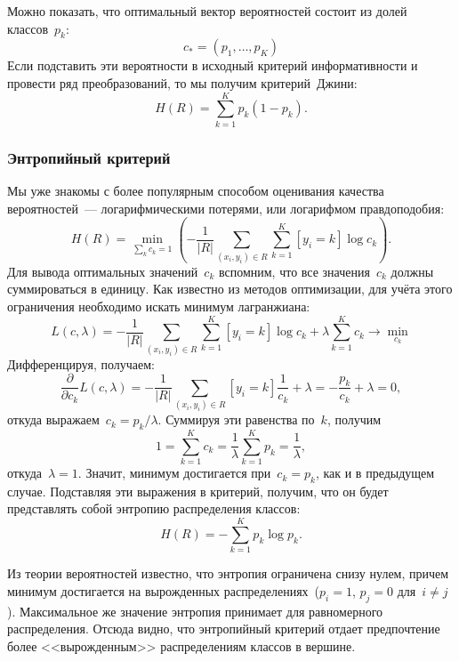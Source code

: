 \documentclass[12pt,fleqn]{article}
\begin{document}
Можно показать, что оптимальный вектор вероятностей состоит из долей классов~$p_k$:
\[
    c_* = (p_1, \dots, p_K)
\]
Если подставить эти вероятности в исходный критерий информативности
и провести ряд преобразований, то мы получим критерий~Джини:
\[
    H(R)
    =
    \sum_{k = 1}^{K}
        p_k (1 - p_k).
\]

\subsubsection{Энтропийный критерий}
Мы уже знакомы с более популярным способом оценивания качества
вероятностей~--- логарифмическими потерями, или логарифмом правдоподобия:
\[
    H(R)
    =
    \min_{\sum_k c_k = 1} \left(
        -
        \frac{1}{|R|}
        \sum_{(x_i, y_i) \in R}
        \sum_{k = 1}^{K}
            [y_i = k]
            \log c_k
    \right).
\]
Для вывода оптимальных значений~$c_k$ вспомним, что все значения~$c_k$
должны суммироваться в единицу.
Как известно из методов оптимизации, для учёта этого ограничения необходимо искать
минимум лагранжиана:
\[
    L(c, \lambda)
    =
    -
    \frac{1}{|R|}
    \sum_{(x_i, y_i) \in R}
    \sum_{k = 1}^{K}
        [y_i = k]
        \log c_k
    +
    \lambda
    \sum_{k = 1}^{K}
        c_k
    \to
    \min_{c_k}
\]
Дифференцируя, получаем:
\[
    \frac{\partial}{\partial c_k}
    L(c, \lambda)
    =
    -
    \frac{1}{|R|}
    \sum_{(x_i, y_i) \in R}
        [y_i = k]
        \frac{1}{c_k}
    +
    \lambda
    =
    - \frac{p_k}{c_k}
    +
    \lambda
    =
    0,
\]
откуда выражаем~$c_k = p_k / \lambda$.
Суммируя эти равенства по~$k$, получим
\[
    1 = \sum_{k = 1}^{K} c_k = \frac{1}{\lambda} \sum_{k = 1}^{K} p_k = \frac{1}{\lambda},
\]
откуда~$\lambda = 1$.
Значит, минимум достигается при~$c_k = p_k$, как и в предыдущем случае.
Подставляя эти выражения в критерий, получим, что он будет представлять собой энтропию распределения классов:
\[
    H(R)
    =
    -
    \sum_{k = 1}^{K}
        p_k
        \log p_k.
\]

Из теории вероятностей известно, что энтропия ограничена снизу нулем, причем минимум достигается на вырожденных
распределениях~($p_i = 1$, $p_j = 0$ для~$i \neq j$).
Максимальное же значение энтропия принимает для равномерного распределения.
Отсюда видно, что энтропийный критерий отдает предпочтение более <<вырожденным>> распределениям классов
в вершине.

\end{document}
